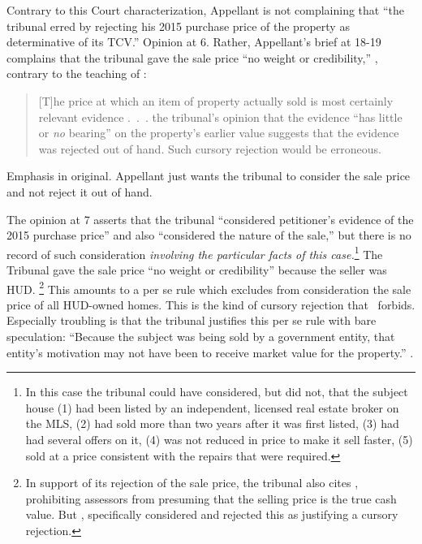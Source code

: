 \documentclass[12pt,\documentclassflag]{michiganCourtOfAppealsBrief}
\begin{document}
Contrary to this Court characterization,
Appellant is not complaining that ``the tribunal erred by rejecting his 2015 purchase price of the
property as determinative of its TCV.'' Opinion at 6. Rather, Appellant's brief at 18-19 complains that the tribunal gave the sale price ``no weight or credibility,'' \reconsiderationDenied[2], contrary to the teaching of :

\begin{quotation}
  [T]he price at which an item of
  property actually sold is most certainly relevant evidence .~.~.
  the tribunal's opinion that the evidence ``has little or \emph{no}
bearing'' on the property's earlier value suggests that the evidence was rejected out of hand. Such cursory rejection would be erroneous.
\end{quotation}
Emphasis in original. Appellant just wants the tribunal to consider the sale price and not reject it out of hand.

The opinion at 7 asserts that the tribunal ``considered petitioner's evidence of the 2015 purchase price'' and also ``considered the nature of the sale,'' but there is no record of such consideration \emph{involving the particular facts of this case.}\footnote{In this case the tribunal could have considered, but did not, that the subject house (1) had been listed by an independent, licensed real estate broker on the MLS, (2) had sold more than two years after it was first listed, (3) had had several offers on it, (4) was not reduced in price to make it sell faster, (5) sold at a price consistent with the repairs that were required.}
The Tribunal gave the sale price ``no weight or credibility'' because the seller was HUD.%
\footnote{In support of its rejection of the sale price, the tribunal also cites \cite[s]{MCL 211.27(6)}, prohibiting assessors from presuming that the selling price is the true cash value. But , specifically considered and rejected this as justifying a cursory rejection.}
This amounts to a per se rule which excludes from consideration the sale price of all HUD-owned homes. This is the kind of cursory rejection that \cite[s]{Jones & Laughlin}\ forbids. Especially troubling is that the tribunal justifies this per se rule with bare speculation: ``Because the subject was being sold by a government entity, that entity's motivation may
not have been to receive market value for the property.'' \reconsiderationDenied[2].
\end{document}
